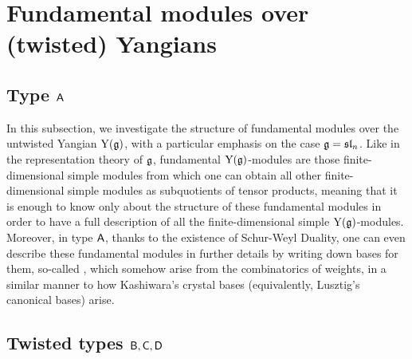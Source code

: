 \section{Fundamental modules over (twisted) Yangians}
    \subsection{Type \texorpdfstring{$\mathsf{A}$}{}}
        In this subsection, we investigate the structure of fundamental modules over the untwisted Yangian $\mathrm{Y}(\mathfrak{g})$, with a particular emphasis on the case $\mathfrak{g} = \mathfrak{sl}_n$. Like in the representation theory of $\mathfrak{g}$, fundamental $\mathrm{Y}(\mathfrak{g})$-modules are those finite-dimensional simple modules from which one can obtain all other finite-dimensional simple modules as subquotients of tensor products, meaning that it is enough to know only about the structure of these fundamental modules in order to have a full description of all the finite-dimensional simple $\mathrm{Y}(\mathfrak{g})$-modules. Moreover, in type $\mathsf{A}$, thanks to the existence of Schur-Weyl Duality, one can even describe these fundamental modules in further details by writing down bases for them, so-called , which somehow arise from the combinatorics of weights, in a similar manner to how Kashiwara's crystal bases (equivalently, Lusztig's canonical bases) arise.

        \begin{definition} \label{def: fundamental_weights_yangians}
            
        \end{definition}

    \subsection{Twisted types \texorpdfstring{$\mathsf{B}, \mathsf{C}, \mathsf{D}$}{}}